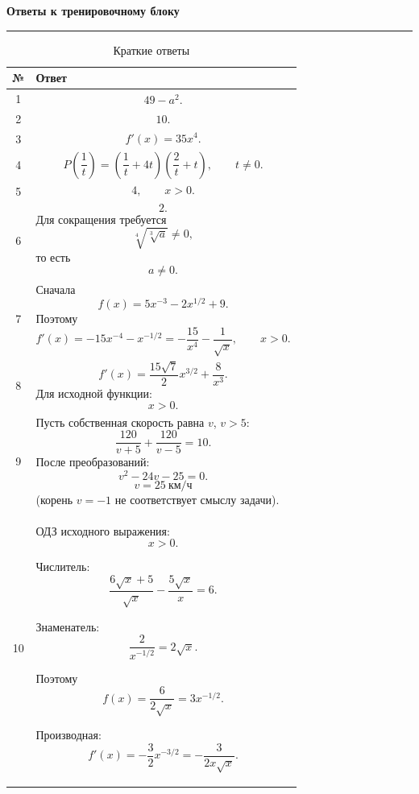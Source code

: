 \documentclass[a4paper,12pt]{article}
\newcommand{\lessonsection}[1]{%
    \vspace{0.5em}
    {\Large\bfseries\color{darkaccent}#1}\par
    \vspace{0.2em}
    {\color{accent}\rule{\linewidth}{0.6pt}}
    \vspace{0.5em}
}
\begin{document}

\clearpage
\lessonsection{Ответы к тренировочному блоку}

\renewcommand{\arraystretch}{1.45}

\begin{table}[ht]
\centering
\caption{Краткие ответы}
\begin{tabularx}{\linewidth}{@{}cX@{}}
\toprule
\textbf{№} & \textbf{Ответ} \\
\midrule

1 &
\[
49-a^2.
\]
\\

2 &
\[
10.
\]
\\

3 &
\[
f'(x)=35x^4.
\]
\\

4 &
\[
P\left(\frac1t\right)
=
\left(\frac1t+4t\right)
\left(\frac2t+t\right),
\qquad t\ne0.
\]
\\

5 &
\[
4,
\qquad x>0.
\]
\\

6 &
\[
2.
\]
Для сокращения требуется
\[
\sqrt[4]{\sqrt[3]{a}}\ne0,
\]
то есть
\[
a\ne0.
\]
\\

7 &
Сначала
\[
f(x)=5x^{-3}-2x^{1/2}+9.
\]
Поэтому
\[
f'(x)
=
-15x^{-4}-x^{-1/2}
=
-\frac{15}{x^4}-\frac1{\sqrt{x}},
\qquad x>0.
\]
\\

8 &
\[
f'(x)
=
\frac{15\sqrt7}{2}x^{3/2}
+
\frac8{x^3}.
\]
Для исходной функции:
\[
x>0.
\]
\\

9 &
Пусть собственная скорость равна \(v\), \(v>5\):
\[
\frac{120}{v+5}+\frac{120}{v-5}=10.
\]
После преобразований:
\[
v^2-24v-25=0.
\]
\[
v=25\ \text{км/ч}
\]
(корень \(v=-1\) не соответствует смыслу задачи).
\\

10 &
ОДЗ исходного выражения:
\[
x>0.
\]

Числитель:
\[
\frac{6\sqrt{x}+5}{\sqrt{x}}
-
\frac{5\sqrt{x}}x
=
6.
\]

Знаменатель:
\[
\frac2{x^{-1/2}}
=
2\sqrt{x}.
\]

Поэтому
\[
f(x)=\frac6{2\sqrt{x}}
=
3x^{-1/2}.
\]

Производная:
\[
f'(x)
=
-\frac32x^{-3/2}
=
-\frac{3}{2x\sqrt{x}}.
\]
\\

\bottomrule
\end{tabularx}
\end{table}
\end{document}

